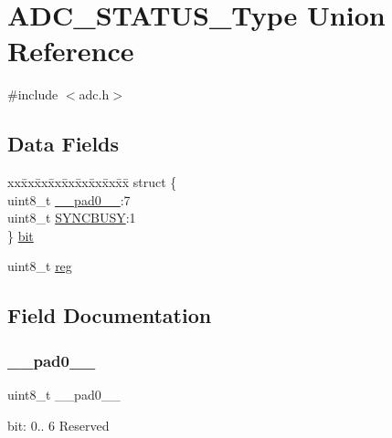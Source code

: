\hypertarget{union_a_d_c___s_t_a_t_u_s___type}{}\section{A\+D\+C\+\_\+\+S\+T\+A\+T\+U\+S\+\_\+\+Type Union Reference}
\label{union_a_d_c___s_t_a_t_u_s___type}


{\ttfamily \#include $<$adc.\+h$>$}

\subsection*{Data Fields}
\begin{DoxyCompactItemize}
\item 
\begin{tabbing}
xx\=xx\=xx\=xx\=xx\=xx\=xx\=xx\=xx\=\kill
struct \{\\
\>uint8\_t \mbox{\hyperlink{union_a_d_c___s_t_a_t_u_s___type_a8b4eebe79ded0459acec2f4950102ba3}{\_\_pad0\_\_}}:7\\
\>uint8\_t \mbox{\hyperlink{union_a_d_c___s_t_a_t_u_s___type_abb30254758e23bd24824e436a1aa8716}{SYNCBUSY}}:1\\
\} \mbox{\hyperlink{union_a_d_c___s_t_a_t_u_s___type_aedcfe69a2d45dfec8bc7bfa702045b21}{bit}}\\

\end{tabbing}\item 
uint8\+\_\+t \mbox{\hyperlink{union_a_d_c___s_t_a_t_u_s___type_a9428adc9af4653a2050e2536b55dec8d}{reg}}
\end{DoxyCompactItemize}


\subsection{Field Documentation}
\mbox{\label{union_a_d_c___s_t_a_t_u_s___type_a8b4eebe79ded0459acec2f4950102ba3}} 
\subsubsection{\texorpdfstring{\_\_pad0\_\_}{\_\_pad0\_\_}}
{\footnotesize\ttfamily uint8\+\_\+t \+\_\+\+\_\+pad0\+\_\+\+\_\+}

bit\+: 0.. 6 Reserved \mbox{\label{union_a_d_c___s_t_a_t_u_s___type_aedcfe69a2d45dfec8bc7bfa702045b21}} 
